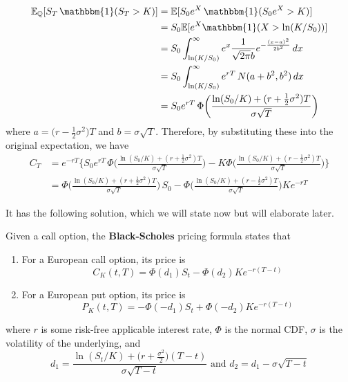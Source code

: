 \documentclass{article}
\begin{document}
    \begin{align}
      \mathbb{E}_{\mathbb{Q}} [S_T \, \mathbbm{1} (S_T > K)] & = \mathbb{E} [S_0 e^X \, \mathbbm{1} (S_0 e^X > K)] \\
                                                             & = S_0 \mathbb{E} [ e^X \mathbbm{1}(X > \ln (K/S_0))] \\
                                                             & = S_0 \int_{\ln(K/S_0)}^\infty e^x \frac{1}{\sqrt{2 \pi} b} e^{-\frac{(x - a)^2}{2 b^2}} \,dx \\
                                                             & = S_0 \int_{\ln(K/S_0)}^\infty e^{rT} \, N(a + b^2, b^2) \,dx \\ 
                                                             & = S_0 e^{rT} \, \Phi \bigg( \frac{\ln(S_0 /K) + (r + \frac{1}{2} \sigma^2) T}{\sigma \sqrt{T}} \bigg)
    \end{align}
    where $a = \big( r - \frac{1}{2} \sigma^2 \big) T$ and $b = \sigma \sqrt{T}$. Therefore, by substituting these into the original expectation, we have 
    \begin{align}
      C_T & = e^{-rT} \bigg\{ S_0 e^{rT} \, \Phi \bigg( \frac{\ln(S_0 /K) + (r + \frac{1}{2} \sigma^2) T}{\sigma \sqrt{T}} \bigg) - K \Phi \bigg( \frac{\ln(S_0 /K) + (r - \frac{1}{2} \sigma^2) T}{\sigma \sqrt{T}} \bigg) \bigg\} \\
          & = \Phi \bigg( \frac{\ln(S_0 /K) + (r + \frac{1}{2} \sigma^2) T}{\sigma \sqrt{T}} \bigg) \, S_0 - \Phi \bigg( \frac{\ln(S_0 /K) + (r - \frac{1}{2} \sigma^2) T}{\sigma \sqrt{T}} \bigg) K e^{-r T}
    \end{align}

    It has the following solution, which we will state now but will elaborate later. 

    \begin{definition}
      Given a call option, the \textbf{Black-Scholes} pricing formula states that 
      \begin{enumerate}
        \item For a European call option, its price is 
        \begin{equation}
          C_K (t, T) = \Phi(d_1) S_t - \Phi (d_2) K e^{-r (T - t)}
        \end{equation}

        \item For a European put option, its price is 
        \begin{equation}
          P_K (t, T) = -\Phi(-d_1) S_t + \Phi (-d_2) K e^{-r (T - t)}
        \end{equation}
      \end{enumerate}
      where $r$ is some risk-free applicable interest rate, $\Phi$ is the normal CDF, $\sigma$ is the volatility of the underlying, and 
      \begin{equation}
        d_1 = \frac{\ln (S_t / K) + \big( r + \frac{\sigma^2}{2}\big) (T - t)}{\sigma \sqrt{T - t}} \text{ and } d_2 = d_1 - \sigma \sqrt{T - t}
      \end{equation}
    \end{definition}
\end{document}
